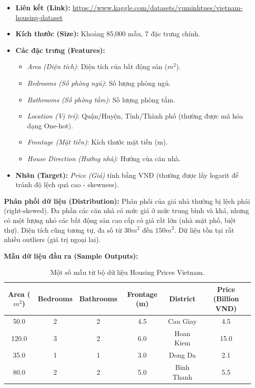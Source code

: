 \documentclass[12pt,a4paper]{article}
\begin{document}
\begin{itemize}
    \item \textbf{Liên kết (Link):} \url{https://www.kaggle.com/datasets/vuminhtues/vietnam-housing-dataset}
    \item \textbf{Kích thước (Size):} Khoảng 85,000 mẫu, 7 đặc trưng chính.
    \item \textbf{Các đặc trưng (Features):}
    \begin{itemize}
        \item \textit{Area (Diện tích)}: Diện tích của bất động sản ($m^2$).
        \item \textit{Bedrooms (Số phòng ngủ)}: Số lượng phòng ngủ.
        \item \textit{Bathrooms (Số phòng tắm)}: Số lượng phòng tắm.
        \item \textit{Location (Vị trí)}: Quận/Huyện, Tỉnh/Thành phố (thường được mã hóa dạng One-hot).
        \item \textit{Frontage (Mặt tiền)}: Kích thước mặt tiền (m).
        \item \textit{House Direction (Hướng nhà)}: Hướng của căn nhà.
    \end{itemize}
    \item \textbf{Nhãn (Target):} \textit{Price (Giá)} tính bằng VNĐ (thường được lấy logarit để tránh độ lệch quá cao - skewness).
\end{itemize}

\textbf{Phân phối dữ liệu (Distribution):}
Phân phối của giá nhà thường bị lệch phải (right-skewed). Đa phần các căn nhà có mức giá ở mức trung bình và khá, nhưng có một lượng nhỏ các bất động sản cao cấp có giá rất lớn (nhà mặt phố, biệt thự). Diện tích cũng tương tự, đa số từ $30m^2$ đến $150m^2$. Dữ liệu tồn tại rất nhiều outliers (giá trị ngoại lai).

\textbf{Mẫu dữ liệu đầu ra (Sample Outputs):}
\begin{table}[h]
\centering
\begin{tabular}{|c|c|c|c|c|c|}
\hline
Area ($m^2$) & Bedrooms & Bathrooms & Frontage (m) & District & Price (Billion VND) \\
\hline
50.0 & 2 & 2 & 4.5 & Cau Giay & 4.5 \\
120.0 & 3 & 2 & 6.0 & Hoan Kiem & 15.0 \\
35.0 & 1 & 1 & 3.0 & Dong Da & 2.1 \\
80.0 & 2 & 2 & 5.0 & Binh Thanh & 5.5 \\
\hline
\end{tabular}
\caption{Một số mẫu từ bộ dữ liệu Housing Prices Vietnam.}
\end{table}
\end{document}
